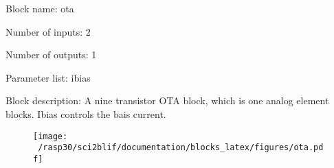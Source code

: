 \pagebreak

Block name: ota

Number of inputs: 2

Number of outputs: 1

Parameter list: ibias

Block description: 
A nine transistor OTA block, which is one analog element blocks. Ibias controls the bais current.

\begin{figure}[H]  %
\texttt{[image: ~/rasp30/sci2blif/documentation/blocks\_latex/figures/ota.pdf]}
\end{figure}

